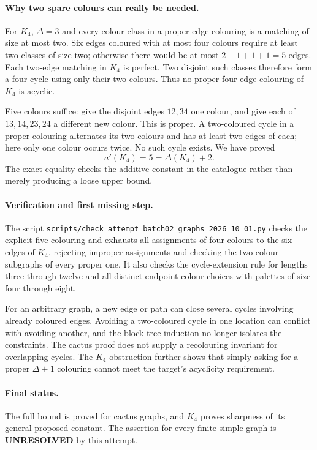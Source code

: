 \documentclass[11pt,a4paper]{article}
\begin{document}
\paragraph{Why two spare colours can really be needed.}
For $K_4$, $\Delta=3$ and every colour class in a proper edge-colouring is a matching of size at most two. Six edges coloured with at most four colours require at least two classes of size two; otherwise there would be at most $2+1+1+1=5$ edges. Each two-edge matching in $K_4$ is perfect. Two disjoint such classes therefore form a four-cycle using only their two colours. Thus no proper four-edge-colouring of $K_4$ is acyclic.

Five colours suffice: give the disjoint edges $12,34$ one colour, and give each of $13,14,23,24$ a different new colour. This is proper. A two-coloured cycle in a proper colouring alternates its two colours and has at least two edges of each; here only one colour occurs twice. No such cycle exists. We have proved
\[
 a'(K_4)=5=\Delta(K_4)+2.
\]
The exact equality checks the additive constant in the catalogue rather than merely producing a loose upper bound.

\paragraph{Verification and first missing step.}
The script \texttt{scripts/check\_attempt\_batch02\_graphs\_2026\_10\_01.py} checks the explicit five-colouring and exhausts all assignments of four colours to the six edges of $K_4$, rejecting improper assignments and checking the two-colour subgraphs of every proper one. It also checks the cycle-extension rule for lengths three through twelve and all distinct endpoint-colour choices with palettes of size four through eight.

For an arbitrary graph, a new edge or path can close several cycles involving already coloured edges. Avoiding a two-coloured cycle in one location can conflict with avoiding another, and the block-tree induction no longer isolates the constraints. The cactus proof does not supply a recolouring invariant for overlapping cycles. The $K_4$ obstruction further shows that simply asking for a proper $\Delta+1$ colouring cannot meet the target's acyclicity requirement.

\paragraph{Final status.}
The full bound is proved for cactus graphs, and $K_4$ proves sharpness of its general proposed constant. The assertion for every finite simple graph is \textbf{UNRESOLVED} by this attempt.
\end{document}
